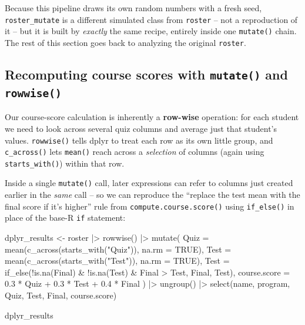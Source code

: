 \documentclass[
  letterpaper,
  DIV=11,
  numbers=noendperiod]{scrreprt}
\newenvironment{Shaded}{\begin{snugshade}}{\end{snugshade}}
\newcommand{\AttributeTok}[1]{\textcolor[rgb]{0.40,0.45,0.13}{#1}}
\newcommand{\ConstantTok}[1]{\textcolor[rgb]{0.56,0.35,0.01}{#1}}
\newcommand{\FloatTok}[1]{\textcolor[rgb]{0.68,0.00,0.00}{#1}}
\newcommand{\FunctionTok}[1]{\textcolor[rgb]{0.28,0.35,0.67}{#1}}
\newcommand{\NormalTok}[1]{\textcolor[rgb]{0.00,0.23,0.31}{#1}}
\newcommand{\OtherTok}[1]{\textcolor[rgb]{0.00,0.23,0.31}{#1}}
\newcommand{\SpecialCharTok}[1]{\textcolor[rgb]{0.37,0.37,0.37}{#1}}
\newcommand{\StringTok}[1]{\textcolor[rgb]{0.13,0.47,0.30}{#1}}
\begin{document}
Because this pipeline draws its own random numbers with a fresh seed,
\texttt{roster\_mutate} is a different simulated class from
\texttt{roster} -- not a reproduction of it -- but it is built by
\emph{exactly} the same recipe, entirely inside one \texttt{mutate()}
chain. The rest of this section goes back to analyzing the original
\texttt{roster}.

\subsection{\texorpdfstring{Recomputing course scores with
\texttt{mutate()} and
\texttt{rowwise()}}{Recomputing course scores with mutate() and rowwise()}}\label{recomputing-course-scores-with-mutate-and-rowwise}

Our course-score calculation is inherently a \textbf{row-wise}
operation: for each student we need to look across several quiz columns
and average just that student's values. \texttt{rowwise()} tells dplyr
to treat each row as its own little group, and \texttt{c\_across()} lets
\texttt{mean()} reach across a \emph{selection} of columns (again using
\texttt{starts\_with()}) within that row.

Inside a single \texttt{mutate()} call, later expressions can refer to
columns just created earlier in the \emph{same} call -- so we can
reproduce the ``replace the test mean with the final score if it's
higher'' rule from \texttt{compute.course.score()} using
\texttt{if\_else()} in place of the base-R \texttt{if} statement:

\begin{Shaded}
\begin{Highlighting}[]
\NormalTok{dplyr\_results }\OtherTok{\textless{}{-}}\NormalTok{ roster }\SpecialCharTok{|\textgreater{}}
    \FunctionTok{rowwise}\NormalTok{() }\SpecialCharTok{|\textgreater{}}
    \FunctionTok{mutate}\NormalTok{(}
        \AttributeTok{Quiz  =} \FunctionTok{mean}\NormalTok{(}\FunctionTok{c\_across}\NormalTok{(}\FunctionTok{starts\_with}\NormalTok{(}\StringTok{"Quiz"}\NormalTok{)), }\AttributeTok{na.rm =} \ConstantTok{TRUE}\NormalTok{),}
        \AttributeTok{Test  =} \FunctionTok{mean}\NormalTok{(}\FunctionTok{c\_across}\NormalTok{(}\FunctionTok{starts\_with}\NormalTok{(}\StringTok{"Test"}\NormalTok{)), }\AttributeTok{na.rm =} \ConstantTok{TRUE}\NormalTok{),}
        \AttributeTok{Test  =} \FunctionTok{if\_else}\NormalTok{(}\SpecialCharTok{!}\FunctionTok{is.na}\NormalTok{(Final) }\SpecialCharTok{\&} \SpecialCharTok{!}\FunctionTok{is.na}\NormalTok{(Test) }\SpecialCharTok{\&}\NormalTok{ Final }\SpecialCharTok{\textgreater{}}\NormalTok{ Test, Final, Test),}
        \AttributeTok{course.score =} \FloatTok{0.3} \SpecialCharTok{*}\NormalTok{ Quiz }\SpecialCharTok{+} \FloatTok{0.3} \SpecialCharTok{*}\NormalTok{ Test }\SpecialCharTok{+} \FloatTok{0.4} \SpecialCharTok{*}\NormalTok{ Final}
\NormalTok{    ) }\SpecialCharTok{|\textgreater{}}
    \FunctionTok{ungroup}\NormalTok{() }\SpecialCharTok{|\textgreater{}}
    \FunctionTok{select}\NormalTok{(name, program, Quiz, Test, Final, course.score)}

\NormalTok{dplyr\_results}
\end{Highlighting}
\end{Shaded}
\end{document}
